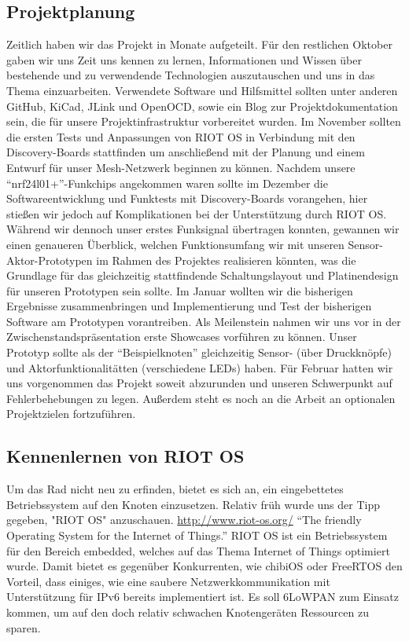 \documentclass{IEEEtran}
\begin{document}
    \subsection{Projektplanung}
    Zeitlich haben wir das Projekt in Monate aufgeteilt. Für den restlichen Oktober 
    gaben wir uns Zeit uns kennen zu lernen, Informationen und Wissen über bestehende 
    und zu verwendende Technologien auszutauschen und uns in das Thema einzuarbeiten.
    Verwendete Software und Hilfsmittel sollten unter anderen GitHub, KiCad, JLink 
    und OpenOCD, sowie ein Blog zur Projektdokumentation sein, die für unsere 
    Projektinfrastruktur vorbereitet wurden.
    Im November sollten die ersten Tests und Anpassungen von RIOT OS in Verbindung 
    mit den Discovery-Boards stattfinden um anschließend mit der Planung und einem 
    Entwurf für unser Mesh-Netzwerk beginnen zu können.
    Nachdem unsere \enquote{nrf24l01+}-Funkchips angekommen waren sollte im Dezember 
    die Softwareentwicklung und  Funktests mit Discovery-Boards vorangehen, hier 
    stießen wir jedoch auf Komplikationen bei der Unterstützung durch RIOT OS. 
    Während wir dennoch unser erstes Funksignal übertragen konnten, gewannen wir 
    einen genaueren Überblick, welchen Funktionsumfang wir mit unseren 
    Sensor-Aktor-Prototypen im Rahmen des Projektes realisieren könnten, was die 
    Grundlage für das gleichzeitig stattfindende Schaltungslayout und 
    Platinendesign für unseren Prototypen sein sollte.
    Im Januar wollten wir die bisherigen Ergebnisse zusammenbringen und  
    Implementierung und Test der bisherigen Software am Prototypen vorantreiben. 
    Als Meilenstein nahmen wir uns vor in der Zwischenstandspräsentation erste 
    Showcases vorführen zu können. Unser Prototyp sollte als der 
    \enquote{Beispielknoten} gleichzeitig Sensor- (über Druckknöpfe) und 
    Aktorfunktionalitätten (verschiedene LEDs) haben.
    Für Februar hatten wir uns vorgenommen das Projekt soweit abzurunden und 
    unseren Schwerpunkt auf Fehlerbehebungen zu legen. Außerdem steht es noch an 
    die Arbeit an optionalen Projektzielen fortzuführen. 

    \subsection{Kennenlernen von RIOT OS}
    Um das Rad nicht neu zu erfinden, bietet es sich an, ein eingebettetes 
    Betriebssystem auf den Knoten einzusetzen. Relativ früh wurde uns der Tipp 
    gegeben, "RIOT OS" anzuschauen. \url{http://www.riot-os.org/} 
    \enquote{The friendly Operating System for the Internet of Things.}
    RIOT OS ist ein Betriebssystem für den Bereich embedded, welches auf das 
    Thema Internet of Things optimiert wurde. 
    Damit bietet es gegenüber Konkurrenten, wie chibiOS oder FreeRTOS den Vorteil, 
    dass einiges, wie eine saubere Netzwerkkommunikation mit Unterstützung für 
    IPv6 bereits implementiert ist. 
    Es soll 6LoWPAN zum Einsatz kommen, um auf den doch relativ schwachen 
    Knotengeräten Ressourcen zu sparen.
\end{document}
